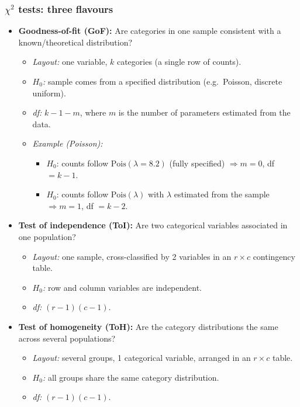 \documentclass[t,8pt]{beamer}
\begin{document}
\begin{frame}
	\frametitle{$\chi^2$ tests: three flavours}
	
	\begin{itemize}
		\item \textbf{Goodness-of-fit (GoF):} Are categories in one sample consistent with a known/theoretical distribution?
		\begin{itemize}
			\item \emph{Layout:} one variable, $k$ categories (a single row of counts).
			\item \emph{$H_0$:} sample comes from a specified distribution
			(e.g.\ Poisson, discrete uniform).
			\item \emph{df:} $k - 1 - m$, where $m$ is the number of parameters
			estimated from the data.
			\item \emph{Example (Poisson):}
			\begin{itemize}
				\item $H_0$: counts follow $\text{Pois}(\lambda=8.2)$ (fully specified) $\Rightarrow m=0$, df $=k-1$.
				\item $H_0$: counts follow $\text{Pois}(\lambda)$ with $\lambda$ estimated from the sample $\Rightarrow m=1$, df $=k-2$.
			\end{itemize}
		\end{itemize}
		
		\vspace{4pt}
		\item \textbf{Test of independence (ToI):} Are two categorical variables associated in one population?
		\begin{itemize}
			\item \emph{Layout:} one sample, cross-classified by 2 variables
			in an $r \times c$ contingency table.
			\item \emph{$H_0$:} row and column variables are independent.
			\item \emph{df:} $(r-1)(c-1)$.
		\end{itemize}
		
		\vspace{4pt}
		\item \textbf{Test of homogeneity (ToH):} Are the category distributions the same across several populations?
		\begin{itemize}
			\item \emph{Layout:} several groups, 1 categorical variable,
			arranged in an $r \times c$ table.
			\item \emph{$H_0$:} all groups share the same category distribution.
			\item \emph{df:} $(r-1)(c-1)$.
		\end{itemize}
	\end{itemize}
	
\end{frame}
\end{document}
